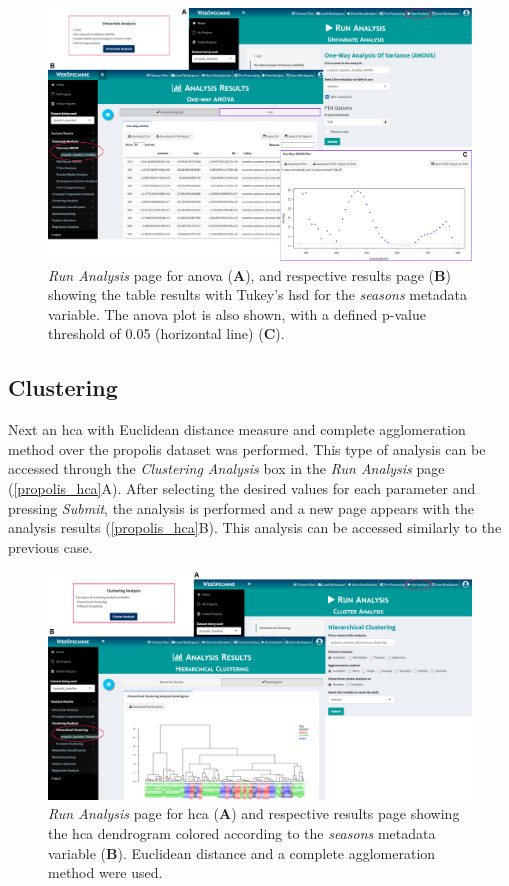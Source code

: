 \begin{figure}[H]
	\centering
	\includegraphics[width=1\linewidth]{Imagens/Propolis/anova}
	\caption{\textit{Run Analysis} page for \gls{anova} (\textbf{A}), and respective results page (\textbf{B}) showing the table results with Tukey's \gls{hsd} for the \textit{seasons} metadata variable. The \gls{anova} plot is also shown, with a defined p-value threshold of 0.05 (horizontal line) (\textbf{C}).}
	\label{propolis_anova}
\end{figure}


\subsection{Clustering}

Next an \acrlong{hca} with Euclidean distance measure and complete agglomeration method over the propolis dataset was performed. This type of analysis can be accessed through the \textit{Clustering Analysis} box in the \textit{Run Analysis} page (\autoref{propolis_hca}A). After selecting the desired values for each parameter and pressing \textit{Submit}, the analysis is performed and a new page appears with the analysis results (\autoref{propolis_hca}B). This analysis can be accessed similarly to the previous case.

\begin{figure}[H]
	\centering
	\includegraphics[width=1\linewidth]{Imagens/Propolis/hca}
	\caption{\textit{Run Analysis} page for \gls{hca} (\textbf{A}) and respective results page showing the \gls{hca} dendrogram colored according to the \textit{seasons} metadata variable (\textbf{B}). Euclidean distance and a complete agglomeration method were used.}
	\label{propolis_hca}
\end{figure}


